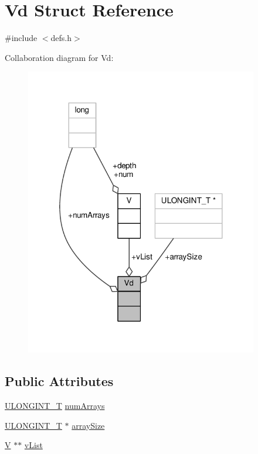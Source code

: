 \hypertarget{structVd}{\section{Vd Struct Reference}
\label{structVd}
}


{\ttfamily \#include $<$defs.\-h$>$}



Collaboration diagram for Vd\-:
\nopagebreak
\begin{figure}[H]
\begin{center}
\leavevmode
\includegraphics[width=288pt]{structVd__coll__graph}
\end{center}
\end{figure}
\subsection*{Public Attributes}
\begin{DoxyCompactItemize}
\item 
\hyperlink{defs_8h_ade719b705ff384b386384c9385517e0b}{U\-L\-O\-N\-G\-I\-N\-T\-\_\-\-T} \hyperlink{structVd_ace6ffd4956a4f631621f7639f0d571b6}{num\-Arrays}
\item 
\hyperlink{defs_8h_ade719b705ff384b386384c9385517e0b}{U\-L\-O\-N\-G\-I\-N\-T\-\_\-\-T} $\ast$ \hyperlink{structVd_a710ff388138def0b2113f3ca52aa77ba}{array\-Size}
\item 
\hyperlink{structV}{V} $\ast$$\ast$ \hyperlink{structVd_a19b892492f1414d3fc5017692476fb3f}{v\-List}
\end{DoxyCompactItemize}


